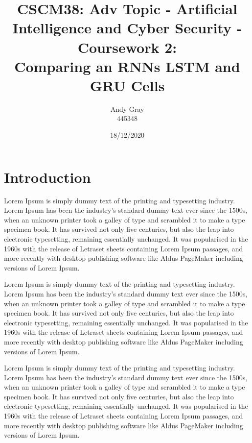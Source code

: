 \documentclass[a4paper,10pt]{article}
\begin{document}
\title{CSCM38: Adv Topic - Artificial Intelligence and Cyber Security - Coursework 2: \\ Comparing an RNNs LSTM and GRU Cells}
\author{Andy Gray\\445348}
\date{18/12/2020}

\maketitle

\section{Introduction}
\label{sec:intro}
	Lorem Ipsum is simply dummy text of the printing and typesetting industry. Lorem Ipsum has been the industry's standard dummy text ever since the 1500s, when an unknown printer took a galley of type and scrambled it to make a type specimen book. It has survived not only five centuries, but also the leap into electronic typesetting, remaining essentially unchanged. It was popularised in the 1960s with the release of Letraset sheets containing Lorem Ipsum passages, and more recently with desktop publishing software like Aldus PageMaker including versions of Lorem Ipsum.

	Lorem Ipsum is simply dummy text of the printing and typesetting industry. Lorem Ipsum has been the industry's standard dummy text ever since the 1500s, when an unknown printer took a galley of type and scrambled it to make a type specimen book. It has survived not only five centuries, but also the leap into electronic typesetting, remaining essentially unchanged. It was popularised in the 1960s with the release of Letraset sheets containing Lorem Ipsum passages, and more recently with desktop publishing software like Aldus PageMaker including versions of Lorem Ipsum.

	Lorem Ipsum is simply dummy text of the printing and typesetting industry. Lorem Ipsum has been the industry's standard dummy text ever since the 1500s, when an unknown printer took a galley of type and scrambled it to make a type specimen book. It has survived not only five centuries, but also the leap into electronic typesetting, remaining essentially unchanged. It was popularised in the 1960s with the release of Letraset sheets containing Lorem Ipsum passages, and more recently with desktop publishing software like Aldus PageMaker including versions of Lorem Ipsum.
\end{document}
